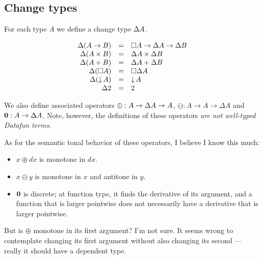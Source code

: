 \documentclass{article}
\begin{document}
\subsection{Change types}

For each type $A$ we define a change type $\Delta A$.

\[\begin{array}{rcl>{\quad\quad}rcl}
  \GD(A \to B) &=& \Disc{A} \to \Delta A \to \Delta B\\
  \GD(A \x B) &=& \GD A \x \GD B\\
  \GD(A + B) &=& \GD A + \GD B\\
  \GD(\Disc{A}) &=& \Disc{\GD A}\\
  \GD(\Down{A}) &=& \Down{A}\\
  \GD \tbool &=& \tbool
\end{array}\]

We also define associated operators $\oplus : A \to \Delta A \to A$, $\ominus : A
\to A \to \Delta A$ and $\mathbf{0} : A \to \Delta A$. Note, however, the
definitions of these operators \emph{are not well-typed Datafun terms}. 

As for the semantic tonal behavior of these operators, I believe I know this
much:
\begin{itemize}
\item $x \oplus dx$ is monotone in $dx$.
\item $x \ominus y$ is monotone in $x$ and antitone in $y$.
\item $\mathbf{0}$ is discrete; at function type, it finds the derivative of its
  argument, and a function that is larger pointwise does not necessarily have a
  derivative that is larger pointwise.
\end{itemize}

But is $\oplus$ monotone in its first argument? I'm not sure. It seems wrong to
contemplate changing its first argument without also changing its second ---
really it should have a dependent type.
\end{document}
